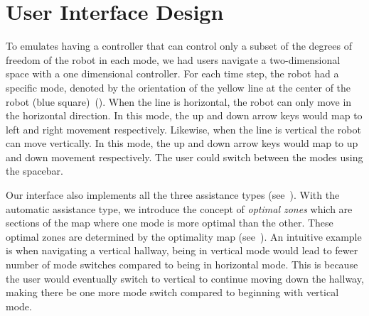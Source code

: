 \section{User Interface Design}
\label{sec:user_interface_design}

To emulates having a controller that can control only a subset of the degrees of freedom of the robot in each mode, we had users navigate a two-dimensional space with a one dimensional controller. For each time step, the robot had a specific mode, denoted by the orientation of the yellow line at the center of the robot (blue square)~(). When the line is horizontal, the robot can only move in the horizontal direction. In this mode, the up and down arrow keys would map to left and right movement respectively. Likewise, when the line is vertical the robot can move vertically. In this mode, the up and down arrow keys would map to up and down movement respectively. The user could switch between the modes using the spacebar.

Our interface also implements all the three assistance types (see~). With the automatic assistance type, we introduce the concept of \textit{optimal zones} which are sections of the map where one mode is more optimal than the other. These optimal zones are determined by the optimality map (see~). An intuitive example is when navigating a vertical hallway, being in vertical mode would lead to fewer number of mode switches compared to being in horizontal mode. This is because the user would eventually switch to vertical to continue moving down the hallway, making there be one more mode switch compared to beginning with vertical mode.
